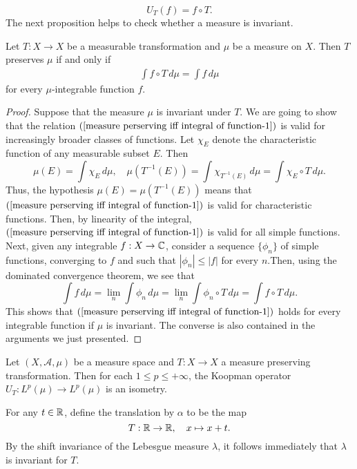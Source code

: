 \[U_T(f)=f\circ T.\]
The next proposition helps to check whether a measure is invariant.
\begin{proposition}\label{measure perserving iff integral of function}
Let $T:X\to X$ be a measurable transformation and $\mu$ be a measure on $X$. Then $T$ preserves $\mu$ if and only if
\begin{align}\label{measure perserving iff integral of function-1}
\int f\circ T\,d\mu=\int f\,d\mu
\end{align}
for every $\mu$-integrable function $f$.
\end{proposition}
\begin{proof}
Suppose that the measure $\mu$ is invariant under $T$. We are going to show that the relation $(\ref{measure perserving iff integral of function-1})$ is valid for increasingly broader classes of functions. Let $\chi_E$ denote the characteristic function of any measurable subset $E$. Then
\[\mu(E)=\int\chi_E\,d\mu,\quad \mu(T^{-1}(E))=\int\chi_{T^{-1}(E)}\,d\mu=\int\chi_E\circ T\,d\mu.\]
Thus, the hypothesis $\mu(E)=\mu(T^{-1}(E))$ means that $(\ref{measure perserving iff integral of function-1})$ is valid for characteristic functions. Then, by linearity of the integral, $(\ref{measure perserving iff integral of function-1})$ is valid for all simple functions. Next, given any integrable $f:X\to\mathbb{C}$, consider a sequence $\{\phi_n\}$ of simple functions, converging to $f$ and such that $|\phi_n|\leq|f|$ for every $n$.Then, using the dominated convergence theorem, we see that
\[\int f\,d\mu=\lim_n\int\phi_n\,d\mu=\lim_n\int\phi_n\circ T\,d\mu=\int f\circ T\,d\mu.\]
This shows that $(\ref{measure perserving iff integral of function-1})$ holds for every integrable function if $\mu$ is invariant. The converse is also contained in the arguments we just presented.
\end{proof}
\begin{corollary}
Let $(X,\mathcal{A},\mu)$ be a measure space and $T:X\to X$ a measure preserving transformation. Then for each $1\leq p\leq+\infty$, the Koopman operator $U_T:L^p(\mu)\to L^p(\mu)$ is an isometry.
\end{corollary}
\begin{example}
For any $t\in\mathbb{R}$, define the translation by $\alpha$ to be the map
\[T:\mathbb{R}\to\mathbb{R},\quad x\mapsto x+t.\]
By the shift invariance of the Lebesgue measure $\lambda$, it follows immediately that $\lambda$ is invariant for $T$. 
\end{example}
